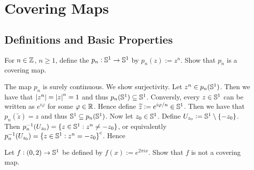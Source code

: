 \chapter{Covering Maps}
\section{Definitions and Basic Properties}

\begin{exercise}
For $n \in \mathbb{Z}$, $n \geq 1$, define the  $p_n : \mathbb{S}^1 \to \mathbb{S}^1$ by $p_n(z) := z^n$. Show that $p_n$ is a covering map.
\end{exercise}

\begin{solution}
The map $p_n$ is surely continuous. We show surjectivity. Let $z^n \in p_n(\mathbb{S}^1)$. Then we have that $\abs[0]{z^n} = \abs[0]{z}^n = 1$ and thus $p_n(\mathbb{S}^1) \subseteq \mathbb{S}^1$. Conversly, every $z \in \mathbb{S}^1$ can be written as $e^{i\varphi}$ for some $\varphi \in \mathbb{R}$. Hence define $\widetilde{z} := e^{i\varphi/n} \in \mathbb{S}^1$. Then we have that $p_n(\widetilde{z}) = z$ and thus $\mathbb{S}^1 \subseteq p_n(\mathbb{S}^1)$. Now let $z_0 \in \mathbb{S}^1$. Define $U_{z_0} := \Sbb^1 \setminus \cbr[0]{-z_0}$. Then $p_n^{-1}(U_{z_0}) = \cbr[0]{z \in \Sbb^1 : z^n \neq -z_0}$, or equivalently $p_n^{-1}(U_{z_0}) = \cbr[0]{z \in \Sbb^1 : z^n = -z_0}^c$. Hence 
\end{solution}

\begin{exercise}
Let $f : \intoo{0,2} \to \Sbb^1$ be defined by $f(x) := e^{2\pi i x}$. Show that $f$ is not a covering map.
\end{exercise}

\begin{solution}

\end{solution}